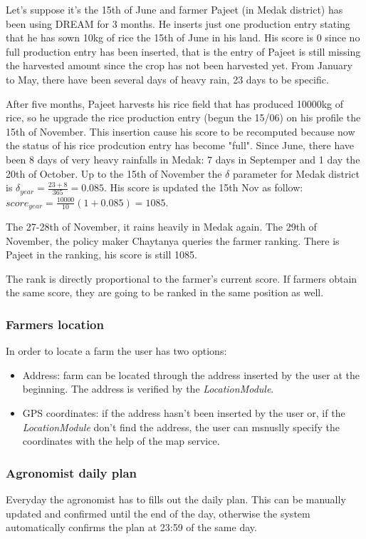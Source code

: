 \documentclass[table, 12pt]{article}
\newcounter{testexample}
\begin{document}
\begin{testexample}
Let's suppose it's the 15th of June and farmer Pajeet (in Medak district) has been using DREAM for 3 months. He inserts just one production entry stating that he has sown 10kg of rice the 15th of June in his land. His score is 0 since no full production entry has been inserted, that is the entry of Pajeet is still missing the harvested amount since the crop has not been harvested yet. From January to May, there have been several days of heavy rain, 23 days to be specific.

After five months, Pajeet harvests his rice field that has produced 10000kg of rice, so he upgrade the rice production entry (begun the 15/06) on his profile the 15th of November. This insertion cause his score to be recomputed because now the status of his rice prodcution entry has become "full". Since June, there have been 8 days of very heavy rainfalls in Medak: 7 days in Septemper and 1 day the 20th of October. Up to the 15th of November the $\delta$ parameter for Medak district is $\delta_{year}=\frac{23+8}{365}=0.085$. His score is updated the 15th Nov as follow: $score_{year}=\frac{10000}{10}(1+0.085)=1085$.

The 27-28th of November, it rains heavily in Medak again. The 29th of November, the policy maker Chaytanya queries the farmer ranking. There is Pajeet in the ranking, his score is still 1085.
\end{testexample}

 The rank is directly proportional to the farmer's current score. If farmers obtain the same score, they are going to be ranked in the same position as well.

\subsubsection{Farmers location} In order to locate a farm the user has two options:
    \begin{itemize}
        \item Address: farm can be located through the address inserted by the user at the beginning.
        The address is verified by the \textit{LocationModule}.
        \item GPS coordinates: if the address hasn't been inserted by the user or, if the \textit{LocationModule} don't find the address, the user can msnuslly specify the coordinates with the help of the map service.
    \end{itemize}
\subsubsection{Agronomist daily plan} Everyday the agronomist has to fills out the daily plan.
This can be manually updated and confirmed until the end of the day, otherwise the system automatically confirms the plan at 23:59 of the same day.
\end{document}
